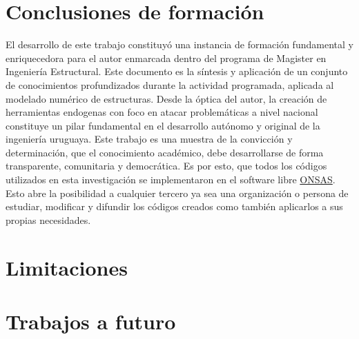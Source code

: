 

\section{Conclusiones de formación}
El desarrollo de este trabajo constituyó una instancia de formación fundamental y enriquecedora para el autor enmarcada dentro del programa de Magister en Ingeniería Estructural. Este documento es la síntesis y aplicación de un conjunto de conocimientos profundizados durante la actividad programada, aplicada al modelado numérico de estructuras. Desde la óptica del autor, la creación de herramientas endogenas con foco en atacar problemáticas a nivel nacional constituye un pilar fundamental en el desarrollo autónomo y original de la ingeniería uruguaya. Este trabajo es una muestra de la convicción y determinación, que el conocimiento académico, debe desarrollarse de forma transparente, comunitaria y democrática. Es por esto, que todos los códigos utilizados en esta investigación se implementaron en el software libre \href{https://github.com/ONSAS/ONSAS/}{ONSAS}. Esto abre la posibilidad a cualquier tercero ya sea una organización o persona de estudiar, modificar y difundir los códigos creados como también aplicarlos a sus propias necesidades. 

\section{Limitaciones }




\section{Trabajos a futuro}





